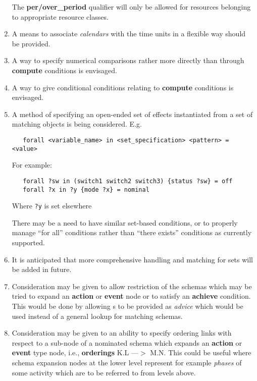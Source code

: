 \begin{enumerate}
The {\bf per/over\_period} qualifier will only be allowed for resources
belonging to appropriate resource classes.

\item A means to associate {\em calendars} with the time units in a
flexible way should be provided. 

\item A way to specify numerical comparisons rather more
directly than through {\bf compute} conditions is envisaged.

\item A way to give conditional conditions relating to {\bf compute} conditions
is envisaged.


\item A method of specifying an open-ended set of effects instantiated
from a set of matching objects is being considered.  E.g.

\begin{verbatim}
   forall <variable_name> in <set_specification> <pattern> = <value>
\end{verbatim}

For example:

\begin{verbatim}
   forall ?sw in (switch1 switch2 switch3) {status ?sw} = off
   forall ?x in ?y {mode ?x} = nominal
\end{verbatim}

\begin{flushright}
Where {\tt ?y} is set elsewhere
\end{flushright}

There may be a need to have similar set-based conditions, or to properly
manage ``for all'' conditions rather than ``there exists'' conditions as
currently supported.

\item It is anticipated that more
comprehensive handling and matching for sets will be added in future.

\item Consideration may be given to allow restriction of the schemas
which may be tried to expand an {\bf action} or {\bf
event} node or to satisfy an {\bf achieve}
condition.  This would be done by allowing s to be
provided as {\em advice} which would be used instead of a general lookup
for matching schemas. 

\item Consideration may be given to an ability to specify ordering links
with respect to a sub-node of a nominated schema which expands an {\bf
action} or {\bf event} type node, i.e.,
{\bf orderings} K.L ---$>$ M.N.  This could be useful where schema expansion
nodes at the lower level represent for example {\em phases} of some
activity which are to be referred to from levels above.


\end{enumerate}
